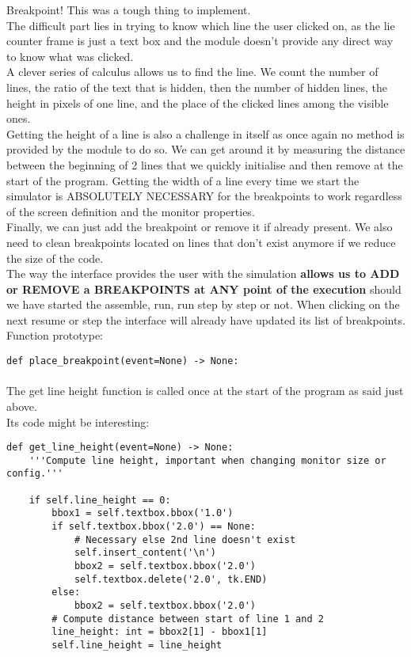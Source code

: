 \documentclass{article}
\newcommand{\n}[0]{\(\backslash\)n}
\begin{document}
Breakpoint! This was a tough thing to implement. \\
The difficult part lies in trying to know which line the user clicked on, as the lie counter frame is just a text box and the module doesn't provide any direct way to know what was clicked. \\
A clever series of calculus allows us to find the line. We count the number of lines, the ratio of the text that is hidden, then the number of hidden lines, the height in pixels of one line, and the place of the clicked lines among the visible ones. \\
Getting the height of a line is also a challenge in itself as once again no method is provided by the module to do so. We can get around it by measuring the distance between the beginning of 2 lines that we quickly initialise and then remove at the start of the program. Getting the width of a line every time we start the simulator is ABSOLUTELY NECESSARY for the breakpoints to work regardless of the screen definition and the monitor properties. \\
Finally, we can just add the breakpoint or remove it if already present. We also need to clean breakpoints located on lines that don't exist anymore if we reduce the size of the code. \\
The way the interface provides the user with the simulation \textbf{allows us to ADD or REMOVE a BREAKPOINTS at ANY point of the execution} should we have started the assemble, run, run step by step or not. When clicking on the next resume or step the interface will already have updated its list of breakpoints. \\
Function prototype: \\

\begin{lstlisting}[language=MyPython]
def place_breakpoint(event=None) -> None:
\end{lstlisting}
\paragraph{}

The get line height function is called once at the start of the program as said just above. \\
Its code might be interesting: \\

\begin{lstlisting}[language=MyPython]
def get_line_height(event=None) -> None:
    '''Compute line height, important when changing monitor size or config.'''

    if self.line_height == 0:
        bbox1 = self.textbox.bbox('1.0')
        if self.textbox.bbox('2.0') == None:
            # Necessary else 2nd line doesn't exist
            self.insert_content('\n')
            bbox2 = self.textbox.bbox('2.0')
            self.textbox.delete('2.0', tk.END)
        else:
            bbox2 = self.textbox.bbox('2.0')
        # Compute distance between start of line 1 and 2
        line_height: int = bbox2[1] - bbox1[1]
        self.line_height = line_height
\end{lstlisting}
\end{document}
